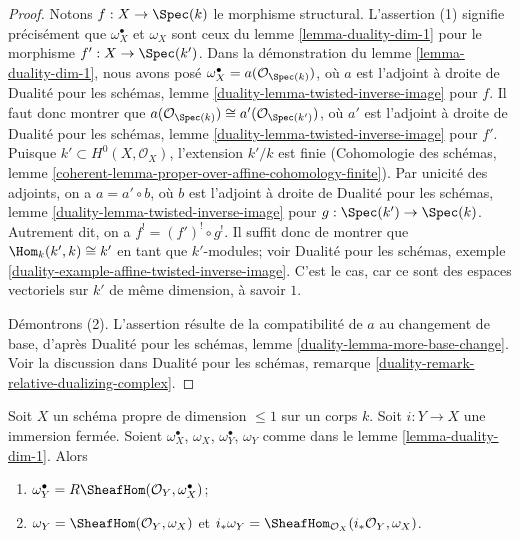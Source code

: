 \begin{proof}
Notons $f : X \to \Spec(k)$ le morphisme structural. L'assertion (1) signifie précisément que $\omega_X^\bullet$ et $\omega_X$ sont ceux du lemme \ref{lemma-duality-dim-1} pour le morphisme $f' : X \to \Spec(k')$. Dans la démonstration du lemme \ref{lemma-duality-dim-1}, nous avons posé $\omega_X^\bullet = a(\mathcal{O}_{\Spec(k)})$, où $a$ est l'adjoint à droite de Dualité pour les schémas, lemme \ref{duality-lemma-twisted-inverse-image} pour $f$. Il faut donc montrer que $a(\mathcal{O}_{\Spec(k)}) \cong a'(\mathcal{O}_{\Spec(k')})$, où $a'$ est l'adjoint à droite de Dualité pour les schémas, lemme \ref{duality-lemma-twisted-inverse-image} pour $f'$. Puisque $k' \subset H^0(X, \mathcal{O}_X)$, l'extension $k'/k$ est finie (Cohomologie des schémas, lemme \ref{coherent-lemma-proper-over-affine-cohomology-finite}). Par unicité des adjoints, on a $a = a' \circ b$, où $b$ est l'adjoint à droite de Dualité pour les schémas, lemme \ref{duality-lemma-twisted-inverse-image} pour $g : \Spec(k') \to \Spec(k)$. Autrement dit, on a $f^! = (f')^! \circ g^!$. Il suffit donc de montrer que $\Hom_k(k', k) \cong k'$ en tant que $k'$-modules; voir Dualité pour les schémas, exemple \ref{duality-example-affine-twisted-inverse-image}. C'est le cas, car ce sont des espaces vectoriels sur $k'$ de même dimension, à savoir $1$.

\medskip\noindent
Démontrons (2). L'assertion résulte de la compatibilité de $a$ au changement de base, d'après Dualité pour les schémas, lemme \ref{duality-lemma-more-base-change}. Voir la discussion dans Dualité pour les schémas, remarque \ref{duality-remark-relative-dualizing-complex}.
\end{proof}

\begin{lemma}
\label{lemma-closed-immersion-dim-1-CM}
Soit $X$ un schéma propre de dimension $\leq 1$ sur un corps $k$. Soit $i : Y \to X$ une immersion fermée. Soient $\omega_X^\bullet$, $\omega_X$, $\omega_Y^\bullet$, $\omega_Y$ comme dans le lemme \ref{lemma-duality-dim-1}. Alors \begin{enumerate} \item $\omega_Y^\bullet = R\SheafHom(\mathcal{O}_Y, \omega_X^\bullet)$; \item $\omega_Y = \SheafHom(\mathcal{O}_Y, \omega_X)$ et $i_*\omega_Y = \SheafHom_{\mathcal{O}_X}(i_*\mathcal{O}_Y, \omega_X)$.
\end{enumerate}
\end{lemma}

